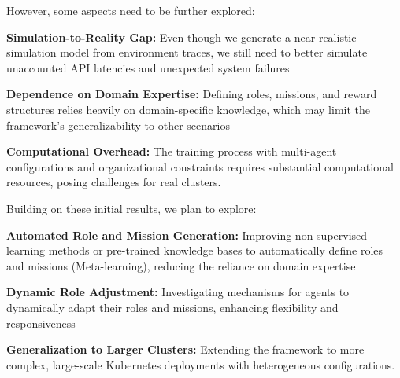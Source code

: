\documentclass[conference]{IEEEtran}
\begin{document}
However, some aspects need to be further explored:
\begin{enumerate*}[label=\textbf{\arabic*)}, itemjoin={;\quad }]
    \item \textbf{Simulation-to-Reality Gap:} Even though we generate a near-realistic simulation model from environment traces, we still need to better simulate unaccounted API latencies and unexpected system failures
    \item \textbf{Dependence on Domain Expertise:} Defining roles, missions, and reward structures relies heavily on domain-specific knowledge, which may limit the framework's generalizability to other scenarios
    \item \textbf{Computational Overhead:} The training process with multi-agent configurations and organizational constraints requires substantial computational resources, posing challenges for real clusters.
\end{enumerate*}

Building on these initial results, we plan to explore:
\begin{enumerate*}[label=\textbf{\arabic*)}, itemjoin={;\quad }]
    \item \textbf{Automated Role and Mission Generation:} Improving non-supervised learning methods or pre-trained knowledge bases to automatically define roles and missions (Meta-learning), reducing the reliance on domain expertise
    \item \textbf{Dynamic Role Adjustment:} Investigating mechanisms for agents to dynamically adapt their roles and missions, enhancing flexibility and responsiveness
    \item \textbf{Generalization to Larger Clusters:} Extending the framework to more complex, large-scale Kubernetes deployments with heterogeneous configurations.
\end{enumerate*}
\end{document}
